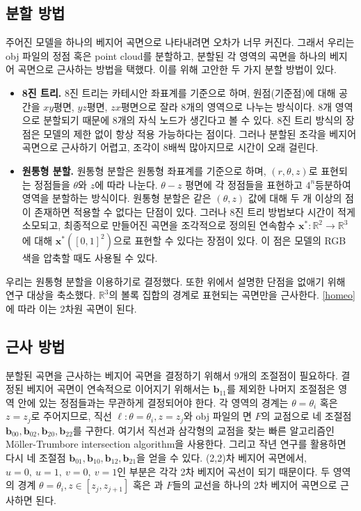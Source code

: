 \documentclass[10pt]{gshs-report-v2.0}
\theoremstyle{theorem}
\theoremstyle{lemma}
\theoremstyle{definition}
\begin{document}
\subsection{분할 방법}
주어진 모델을 하나의 베지어 곡면으로 나타내려면 오차가 너무 커진다. 그래서 우리는 obj 파일의 정점 혹은 point cloud를 분할하고, 분할된 각 영역의 곡면을 하나의 베지어 곡면으로 근사하는 방법을 택했다. 이를 위해 고안한 두 가지 분할 방법이 있다. 

\begin{itemize}
	\item \textbf{8진 트리.} 8진 트리는 카테시안 좌표계를 기준으로 하며, 원점(기준점)에 대해 공간을 $xy$평면, $yz$평면, $zx$평면으로 잘라 8개의 영역으로 나누는 방식이다. 8개 영역으로 분할되기 때문에 8개의 자식 노드가 생긴다고 볼 수 있다. 8진 트리 방식의 장점은 모델의 제한 없이 항상 적용 가능하다는 점이다. 그러나 분할된 조각을 베지어 곡면으로 근사하기 어렵고, 조각이 8배씩 많아지므로 시간이 오래 걸린다.
	
	\item \textbf{원통형 분할.} 원통형 분할은 원통형 좌표계를 기준으로 하며, $(r, \theta, z)$로 표현되는 정점들을 $\theta$와 $z$에 따라 나눈다. $\theta-z$ 평면에 각 정점들을 표현하고 $4^n$등분하여 영역을 분할하는 방식이다. 원통형 분할은 같은 $(\theta, z)$ 값에 대해 두 개 이상의 점이 존재하면 적용할 수 없다는 단점이 있다. 그러나 8진 트리 방법보다 시간이 적게 소모되고, 최종적으로 만들어진 곡면을 조각적으로 정의된 연속함수 $\mathbf{x}^*\colon\mathbb{R}^2\to\mathbb{R}^3$에 대해 $\mathbf{x}^*([0, 1]^2)$으로 표현할 수 있다는 장점이 있다. 이 점은 모델의 RGB 색을 압축할 때도 사용될 수 있다. 
\end{itemize}

우리는 원통형 분할을 이용하기로 결정했다. 또한 위에서 설명한 단점을 없애기 위해 연구 대상을 축소했다. $\mathbb{R}^3$의 볼록 집합의 경계로 표현되는 곡면만을 근사한다. \cref{homeo}에 따라 이는 2차원 곡면이 된다. 

\subsection{근사 방법}
분할된 곡면을 근사하는 베지어 곡면을 결정하기 위해서 9개의 조절점이 필요하다. 결정된 베지어 곡면이 연속적으로 이어지기 위해서는 $\mathbf{b}_{11}$를 제외한 나머지 조절점은 영역 안에 있는 정점들과는 무관하게 결정되어야 한다. 각 영역의 경계는 $\theta=\theta_i$ 혹은 $z=z_j$로 주어지므로, 직선 $\ell \colon \theta=\theta_i, z=z_j$와 obj 파일의 면 $F$의 교점으로 네 조절점 $\mathbf{b}_{00}, \mathbf{b}_{02}, \mathbf{b}_{20}, \mathbf{b}_{22}$를 구한다. 여기서 직선과 삼각형의 교점을 찾는 빠른 알고리즘인 Möller-Trumbore intersection algorithm을 사용한다.\cite{raytriangle} 그리고 작년 연구를 활용하면 다시 네 조절점 $\mathbf{b}_{01}, \mathbf{b}_{10}, \mathbf{b}_{12}, \mathbf{b}_{21}$을 얻을 수 있다. (2,2)차 베지어 곡면에서, $u=0,\ u=1,\ v=0,\ v=1$인 부분은 각각 2차 베지어 곡선이 되기 때문이다. 두 영역의 경계 $\theta=\theta_i, z\in[z_j, z_{j+1}]$ 혹은 과 $F$들의 교선을 하나의 2차 베지어 곡면으로 근사하면 된다.\cite{last year} 
\end{document}
